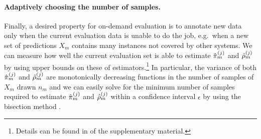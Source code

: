 \paragraph{Adaptively choosing the number of samples.}
Finally, a desired property for on-demand evaluation is to annotate new data only when the current evaluation data is unable to do the job, e.g.\ when a new set of predictions $X_m$ contains many instances not covered by other systems.
We can measure how well the current evaluation set is able to estimate ${\hat{\pi}}_m^{(j)}$ and ${\hat{\rho}}_m^{(j)}$ by using upper bounds on these of estimators.\footnote{Details can be found in  of the supplementary material.}
In particular, the variance of both ${\hat{\pi}}_m^{(j)}$ and ${\hat{\rho}}_m^{(j)}$ are monotonically decreasing functions in the number of samples of $X_m$ drawn $n_m$ and we can easily solve for the minimum number of samples required to estimate ${\hat{\pi}}_m^{(j)}$ and ${\hat{\rho}}_m^{(j)}$ within a confidence interval $\epsilon$ by using the bisection method \citep{burden1985bisection}.
